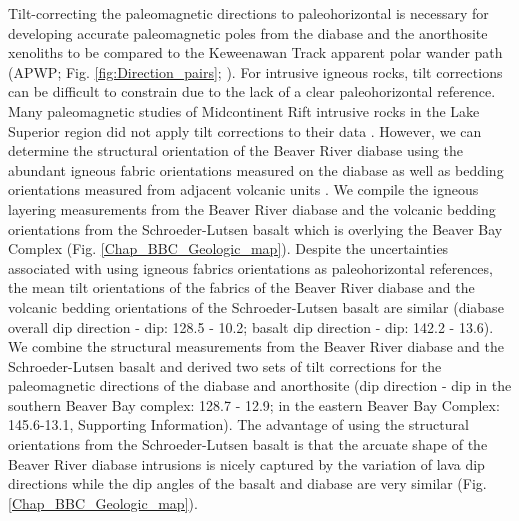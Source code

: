 Tilt-correcting the paleomagnetic directions to paleohorizontal is necessary for developing accurate paleomagnetic poles from the diabase and the anorthosite xenoliths to be compared to the Keweenawan Track apparent polar wander path (APWP; Fig. \ref{fig:Direction_pairs}; \citealp{Swanson-Hysell2019a}). For intrusive igneous rocks, tilt corrections can be difficult to constrain due to the lack of a clear paleohorizontal reference. Many paleomagnetic studies of Midcontinent Rift intrusive rocks in the Lake Superior region did not apply tilt corrections to their data \cite[e.g.][]{Beck1969a, Beck1970a, Books1966a}. However, we can determine the structural orientation of the Beaver River diabase using the abundant igneous fabric orientations measured on the diabase as well as bedding orientations measured from adjacent volcanic units \citep{Boerboom2004a, Boerboom2006a, Boerboom2006b, Boerboom2007a, Miller2001a}. We compile the igneous layering measurements from the Beaver River diabase and the volcanic bedding orientations from the Schroeder-Lutsen basalt which is overlying the Beaver Bay Complex (Fig. \ref{Chap_BBC_Geologic_map}). Despite the uncertainties associated with using igneous fabrics orientations as paleohorizontal references, the mean tilt orientations of the fabrics of the Beaver River diabase and the volcanic bedding orientations of the Schroeder-Lutsen basalt are similar (diabase overall dip direction - dip: 128.5 - 10.2; basalt dip direction - dip: 142.2 - 13.6). We combine the structural measurements from the Beaver River diabase and the Schroeder-Lutsen basalt and derived two sets of tilt corrections for the paleomagnetic directions of the diabase and anorthosite (dip direction - dip in the southern Beaver Bay complex: 128.7 - 12.9; in the eastern Beaver Bay Complex: 145.6-13.1, Supporting Information). The advantage of using the structural orientations from the Schroeder-Lutsen basalt is that the arcuate shape of the Beaver River diabase intrusions is nicely captured by the variation of lava dip directions while the dip angles of the basalt and diabase are very similar (Fig. \ref{Chap_BBC_Geologic_map}).

